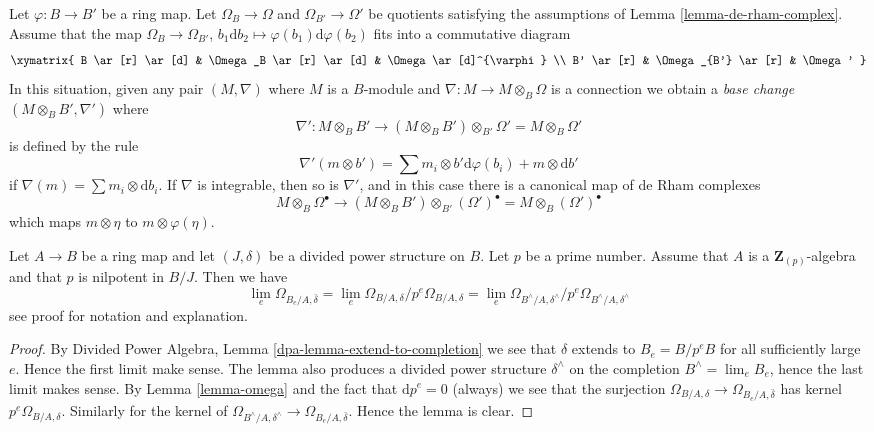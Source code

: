 \begin{remark}
\label{remark-base-change-connection}
Let $\varphi : B \to B'$ be a ring map. Let $\Omega_B \to \Omega$ and
$\Omega_{B'} \to \Omega'$ be quotients satisfying the assumptions of
Lemma \ref{lemma-de-rham-complex}. Assume that the map
$\Omega_B \to \Omega_{B'}$,
$b_1\text{d}b_2 \mapsto \varphi(b_1)\text{d}\varphi(b_2)$ fits into a
commutative diagram
$$
\xymatrix{
B \ar[r] \ar[d] & \Omega_B \ar[r] \ar[d] & \Omega \ar[d]^{\varphi} \\
B' \ar[r] & \Omega_{B'} \ar[r] & \Omega'
}
$$
In this situation, given any pair $(M, \nabla)$ where $M$ is a $B$-module
and $\nabla : M \to M \otimes_B \Omega$ is a connection
we obtain a {\it base change} $(M \otimes_B B', \nabla')$ where
$$
\nabla' :
M \otimes_B B'
\longrightarrow
(M \otimes_B B') \otimes_{B'} \Omega' = M \otimes_B \Omega'
$$
is defined by the rule
$$
\nabla'(m \otimes b') =
\sum m_i \otimes b'\text{d}\varphi(b_i) + m \otimes \text{d}b' 
$$
if $\nabla(m) = \sum m_i \otimes \text{d}b_i$. If $\nabla$ is integrable,
then so is $\nabla'$, and in this case there is a canonical map of
de Rham complexes
\begin{equation}
\label{equation-base-change-map-complexes}
M \otimes_B \Omega^\bullet
\longrightarrow
(M \otimes_B B') \otimes_{B'} (\Omega')^\bullet =
M \otimes_B (\Omega')^\bullet
\end{equation}
which maps $m \otimes \eta$ to $m \otimes \varphi(\eta)$.
\end{remark}

\begin{lemma}
\label{lemma-differentials-completion}
Let $A \to B$ be a ring map and let $(J, \delta)$ be a divided power
structure on $B$. Let $p$ be a prime number. Assume that $A$ is a
$\mathbf{Z}_{(p)}$-algebra and that $p$ is nilpotent in $B/J$. Then
we have
$$
\lim_e \Omega_{B_e/A, \bar\delta} =
\lim_e \Omega_{B/A, \delta}/p^e\Omega_{B/A, \delta} =
\lim_e \Omega_{B^\wedge/A, \delta^\wedge}/p^e \Omega_{B^\wedge/A, \delta^\wedge}
$$
see proof for notation and explanation.
\end{lemma}

\begin{proof}
By Divided Power Algebra, Lemma \ref{dpa-lemma-extend-to-completion}
we see that $\delta$ extends
to $B_e = B/p^eB$ for all sufficiently large $e$. Hence the first limit
make sense. The lemma also produces a divided power structure $\delta^\wedge$
on the completion $B^\wedge = \lim_e B_e$, hence the last limit makes
sense. By Lemma \ref{lemma-omega}
and the fact that $\text{d}p^e = 0$ (always)
we see that the surjection
$\Omega_{B/A, \delta} \to \Omega_{B_e/A, \bar\delta}$ has kernel
$p^e\Omega_{B/A, \delta}$. Similarly for the kernel of 
$\Omega_{B^\wedge/A, \delta^\wedge} \to \Omega_{B_e/A, \bar\delta}$.
Hence the lemma is clear.
\end{proof}



